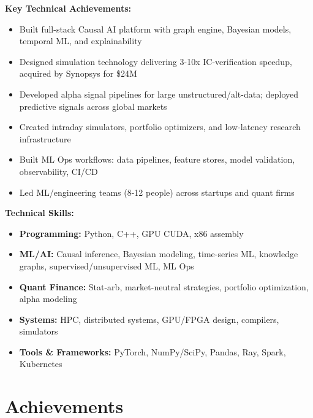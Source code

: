 \documentclass[10pt, letterpaper]{article}
\providecommand{\tightlist}{%
\setlength{\itemsep}{0pt}
\setlength{\parskip}{0pt}}
\begin{document}
  \textbf{Key Technical Achievements:}
  \begin{itemize}
    \tightlist

    \item Built full-stack Causal AI platform with graph engine,
      Bayesian models, temporal ML, and explainability

    \item Designed simulation technology delivering 3-10x IC-verification
      speedup, acquired by Synopsys for \$24M

    \item Developed alpha signal pipelines for large unstructured/alt-data;
      deployed predictive signals across global markets

    \item Created intraday simulators, portfolio optimizers, and low-latency
      research infrastructure

    \item Built ML Ops workflows: data pipelines, feature stores, model
      validation, observability, CI/CD

    \item Led ML/engineering teams (8-12 people) across startups and quant
      firms
  \end{itemize}

  \textbf{Technical Skills:}
  \begin{itemize}
    \tightlist

    \item \textbf{Programming:} Python, C++, GPU CUDA, x86 assembly

    \item \textbf{ML/AI:} Causal inference, Bayesian modeling, time-series
      ML, knowledge graphs, supervised/unsupervised ML, ML Ops

    \item \textbf{Quant Finance:} Stat-arb, market-neutral strategies,
      portfolio optimization, alpha modeling

    \item \textbf{Systems:} HPC, distributed systems, GPU/FPGA design, compilers,
      simulators

    \item \textbf{Tools \& Frameworks:} PyTorch, NumPy/SciPy, Pandas, Ray,
      Spark, Kubernetes
  \end{itemize}

  \section{\texorpdfstring{\textbf{Achievements}}{Achievements}}
  \label{achievements}
\end{document}
